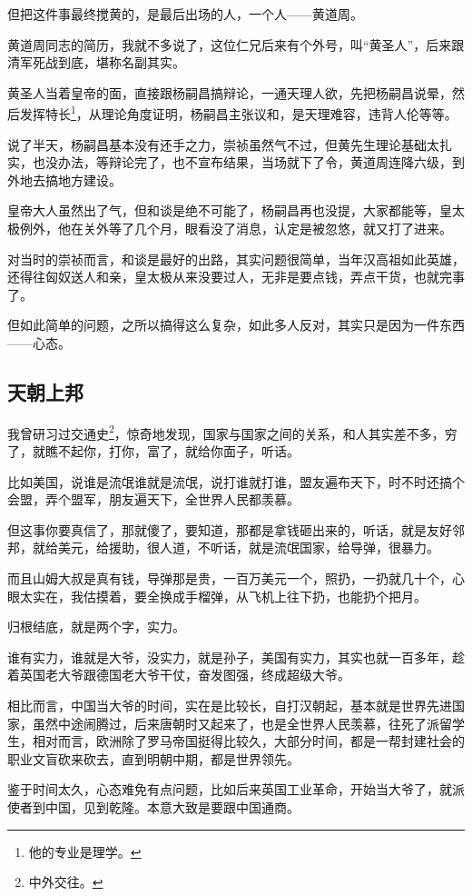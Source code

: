 \begin{multicols}{\theparacolNo}
但把这件事最终搅黄的，是最后出场的人，一个人——黄道周。

黄道周同志的简历，我就不多说了，这位仁兄后来有个外号，叫“黄圣人”，后来跟清军死战到底，堪称名副其实。

黄圣人当着皇帝的面，直接跟杨嗣昌搞辩论，一通天理人欲，先把杨嗣昌说晕，然后发挥特长\footnote{他的专业是理学。}，从理论角度证明，杨嗣昌主张议和，是天理难容，违背人伦等等。

说了半天，杨嗣昌基本没有还手之力，崇祯虽然气不过，但黄先生理论基础太扎实，也没办法，等辩论完了，也不宣布结果，当场就下了令，黄道周连降六级，到外地去搞地方建设。

皇帝大人虽然出了气，但和谈是绝不可能了，杨嗣昌再也没提，大家都能等，皇太极例外，他在关外等了几个月，眼看没了消息，认定是被忽悠，就又打了进来。

对当时的崇祯而言，和谈是最好的出路，其实问题很简单，当年汉高祖如此英雄，还得往匈奴送人和亲，皇太极从来没要过人，无非是要点钱，弄点干货，也就完事了。

但如此简单的问题，之所以搞得这么复杂，如此多人反对，其实只是因为一件东西——心态。

\subsection{天朝上邦}
我曾研习过交通史\footnote{中外交往。}，惊奇地发现，国家与国家之间的关系，和人其实差不多，穷了，就瞧不起你，打你，富了，就给你面子，听话。

比如美国，说谁是流氓谁就是流氓，说打谁就打谁，盟友遍布天下，时不时还搞个会盟，弄个盟军，朋友遍天下，全世界人民都羡慕。

但这事你要真信了，那就傻了，要知道，那都是拿钱砸出来的，听话，就是友好邻邦，就给美元，给援助，很人道，不听话，就是流氓国家，给导弹，很暴力。

而且山姆大叔是真有钱，导弹那是贵，一百万美元一个，照扔，一扔就几十个，心眼太实在，我估摸着，要全换成手榴弹，从飞机上往下扔，也能扔个把月。

归根结底，就是两个字，实力。

谁有实力，谁就是大爷，没实力，就是孙子，美国有实力，其实也就一百多年，趁着英国老大爷跟德国老大爷干仗，奋发图强，终成超级大爷。

相比而言，中国当大爷的时间，实在是比较长，自打汉朝起，基本就是世界先进国家，虽然中途闹腾过，后来唐朝时又起来了，也是全世界人民羡慕，往死了派留学生，相对而言，欧洲除了罗马帝国挺得比较久，大部分时间，都是一帮封建社会的职业文盲砍来砍去，直到明朝中期，都是世界领先。

鉴于时间太久，心态难免有点问题，比如后来英国工业革命，开始当大爷了，就派使者到中国，见到乾隆。本意大致是要跟中国通商。


\end{multicols}
